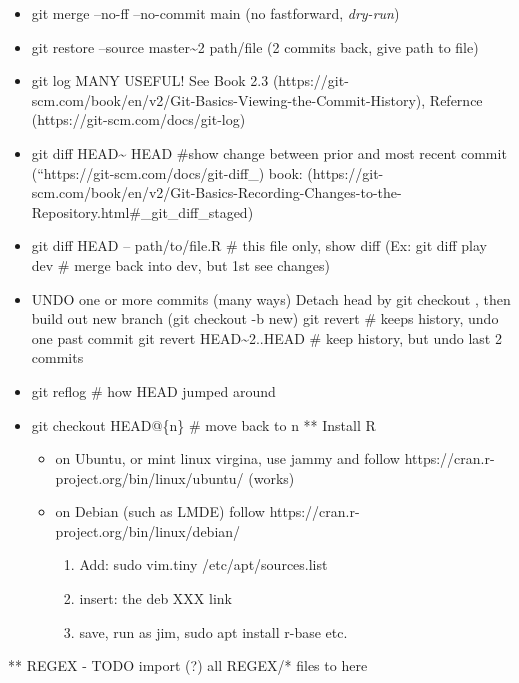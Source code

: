 \documentclass[
  letterpaper,
  DIV=11,
  numbers=noendperiod]{scrartcl}
\providecommand{\tightlist}{%
  \setlength{\itemsep}{0pt}\setlength{\parskip}{0pt}}\usepackage{longtable,booktabs,array}
\begin{document}
\begin{itemize}
\item
  git merge --no-ff --no-commit main (no fastforward, \emph{dry-run})
\item
  git restore --source master\textasciitilde2 path/file (2 commits back,
  give path to file)
\item
  git log MANY USEFUL! See Book 2.3
  (https://git-scm.com/book/en/v2/Git-Basics-Viewing-the-Commit-History),
  Refernce (https://git-scm.com/docs/git-log)
\item
  git diff HEAD\textasciitilde{} HEAD \#show change between prior and
  most recent commit (``https://git-scm.com/docs/git-diff\_) book:
  (https://git-scm.com/book/en/v2/Git-Basics-Recording-Changes-to-the-Repository.html\#\_git\_diff\_staged)
\item
  git diff HEAD -- path/to/file.R \# this file only, show diff (Ex: git
  diff play dev \# merge back into dev, but 1st see changes)
\item[$\square$]
  UNDO one or more commits (many ways) Detach head by git checkout ,
  then build out new branch (git checkout -b new) git revert \# keeps
  history, undo one past commit git revert HEAD\textasciitilde2..HEAD \#
  keep history, but undo last 2 commits
\item
  git reflog \# how HEAD jumped around
\item
  git checkout HEAD@\{n\} \# move back to n ** Install R

  \begin{itemize}
  \tightlist
  \item
    on Ubuntu, or mint linux virgina, use jammy and follow
    https://cran.r-project.org/bin/linux/ubuntu/ (works)\\
  \item
    on Debian (such as LMDE) follow
    https://cran.r-project.org/bin/linux/debian/

    \begin{enumerate}
    \def\labelenumi{(\arabic{enumi})}
    \tightlist
    \item
      Add: sudo vim.tiny /etc/apt/sources.list
    \item
      insert: the deb XXX link
    \item
      save, run as jim, sudo apt install r-base etc.
    \end{enumerate}
  \end{itemize}
\end{itemize}

** REGEX - TODO import (?) all REGEX/* files to here
\end{document}
